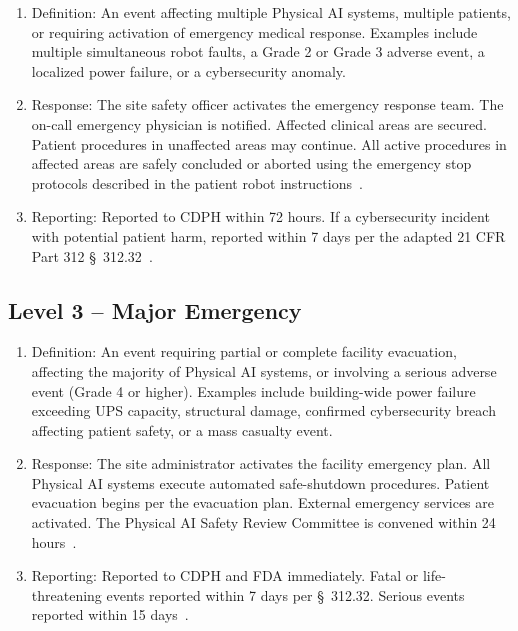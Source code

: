 \begin{enumerate}[label=(\alph*)]
\item Definition: An event affecting multiple Physical AI systems, multiple
  patients, or requiring activation of emergency medical response. Examples
  include multiple simultaneous robot faults, a Grade 2 or Grade 3 adverse
  event, a localized power failure, or a cybersecurity anomaly.

\item Response: The site safety officer activates the emergency response team.
  The on-call emergency physician is notified. Affected clinical areas are
  secured. Patient procedures in unaffected areas may continue. All active
  procedures in affected areas are safely concluded or aborted using the
  emergency stop protocols described in the patient robot
  instructions~\cite{patientinstructions2026}.

\item Reporting: Reported to CDPH within 72 hours. If a cybersecurity incident
  with potential patient harm, reported within 7 days per the adapted 21 CFR
  Part 312 \S~312.32~\cite{cfr312adapt}.
\end{enumerate}

\subsection{Level 3 -- Major Emergency}

\begin{enumerate}[label=(\alph*)]
\item Definition: An event requiring partial or complete facility evacuation,
  affecting the majority of Physical AI systems, or involving a serious
  adverse event (Grade 4 or higher). Examples include building-wide power
  failure exceeding UPS capacity, structural damage, confirmed cybersecurity
  breach affecting patient safety, or a mass casualty event.

\item Response: The site administrator activates the facility emergency plan.
  All Physical AI systems execute automated safe-shutdown procedures. Patient
  evacuation begins per the evacuation plan. External emergency services are
  activated. The Physical AI Safety Review Committee is convened within 24
  hours~\cite{cfr312adapt}.

\item Reporting: Reported to CDPH and FDA immediately. Fatal or
  life-threatening events reported within 7 days per \S~312.32. Serious
  events reported within 15 days~\cite{cfr312adapt}.
\end{enumerate}

